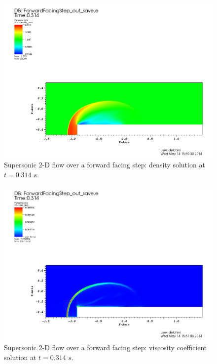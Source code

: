 \begin{figure}[H]
\centering
\includegraphics[width=\textwidth]{figures/FFSDensityEqualTo0p314.png}
\caption{Supersonic $2$-D flow over a forward facing step: density solution at $t=0.314$ $s$.}
\label{fig:2d_ffs_rho_0314}
\end{figure}
%
\begin{figure}[H]
\centering
\includegraphics[width=\textwidth]{figures/FFSVisctEqualTo0p314.png}
\caption{Supersonic $2$-D flow over a forward facing step: viscosity coefficient solution at $t=0.314$ $s$.}
\label{fig:2d_ffs_visc_0314}
\end{figure}
%
